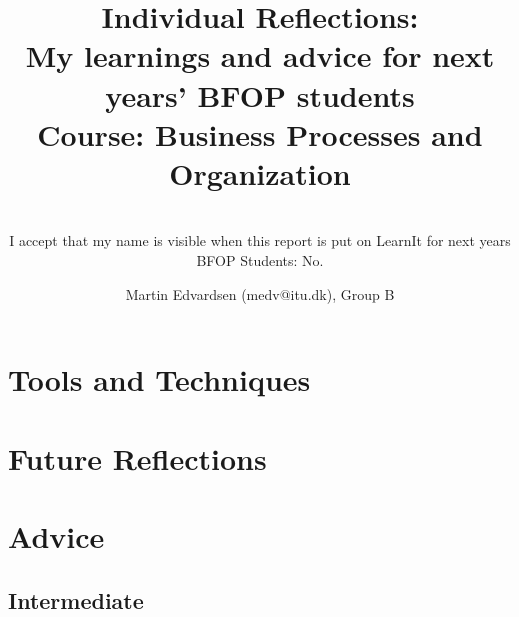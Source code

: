\documentclass{report}
\title
{
	\textbf{Individual Reflections: \\ My learnings and advice for next years' BFOP students} \\
	\textbf{Course:} Business Processes and Organization
}
\author
{
	Martin Edvardsen (medv@itu.dk), Group B \\
}
\subtitle
{
	~\\
	I accept that my name is visible when this report is put on LearnIt for next years BFOP Students: No.
}
\begin{document}
\maketitle

\chapter{Tools and Techniques}
	\label{tools}
	
\chapter{Future Reflections}
	\label{future}
	
\chapter{Advice}
	\label{advice}
	




\begin{appendices}
	\chapter{Intermediate}\label{interviews}
\end{appendices}
\end{document}
